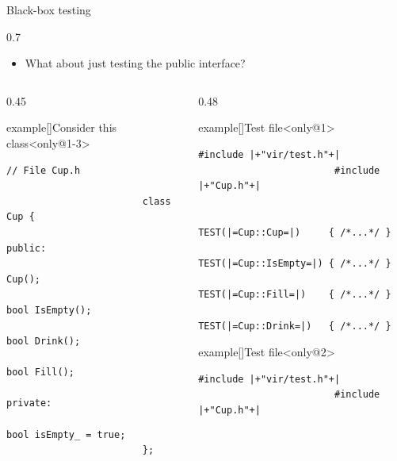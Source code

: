\begin{frame}[fragile]{Black-box testing}
    \vspace{-3mm}
    \begin{overlayarea}{\textwidth}{0.7\textheight}
        \begin{itemize}
            \item What about just testing the public interface?
        \end{itemize}
        \vspace{-3mm}
        \begin{columns}[T]
            \begin{column}{0.45\textwidth}
                \begin{varblock}{example}[\textwidth]{Consider this class}<only@1-3>
                    \begin{lstlisting}[style=MyCpp]
                        // File Cup.h

                        class Cup {
                            public:
                            Cup();
                            bool IsEmpty();
                            bool Drink();
                            bool Fill();
                            private:
                            bool isEmpty_ = true;
                        };
                    \end{lstlisting}
                \end{varblock}
                \centering%
            \end{column}
            \begin{column}{0.48\textwidth}
                \begin{varblock}{example}[\textwidth]{Test file}<only@1>
                    \begin{lstlisting}[style=MyCpp]
                        #include |+"vir/test.h"+|
                        #include |+"Cup.h"+|

                        TEST(|=Cup::Cup=|)     { /*...*/ }
                        TEST(|=Cup::IsEmpty=|) { /*...*/ }
                        TEST(|=Cup::Fill=|)    { /*...*/ }
                        TEST(|=Cup::Drink=|)   { /*...*/ }
                    \end{lstlisting}
                \end{varblock}
                \begin{varblock}{example}[\textwidth]{Test file}<only@2>
                    \begin{lstlisting}[style=MyCpp]
                        #include |+"vir/test.h"+|
                        #include |+"Cup.h"+|


\end{lstlisting}
\end{varblock}
\end{column}
\end{columns}
\end{overlayarea}
\end{frame}
